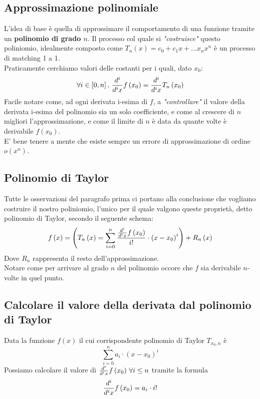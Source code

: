 \documentclass{report}
\begin{document}
    \subsection{Approssimazione polinomiale}
        L'idea di base è quella di approssimare il comportamento di una funzione 
        tramite un \textbf{polinomio di grado $n$}.
        Il processo col quale si \textit{"costruisce"} questo poliniomio, idealmente composto come $T_n\left(x\right) = c_0 + c_1x + ... x_nx^n$
        è un processo di matching 1 a 1. \\
        Praticamente cerchiamo valori delle costanti per i quali, dato $x_0$:
        $$\forall i \in \left[0, n\right], \, \D{x}{i}f\left(x_0\right) = \D{x}{i}T_n\left(x_0\right)$$
        Facile notare come, ad ogni derivata i-esima di $f$, a \textit{"controllare"} il valore 
        della derivata i-esima del polinomio sia un solo coefficiente, e
        come al crescere di $n$ migliori l'approssimazione, e come il limite 
        di $n$ è data da quante volte è derivabile $f\left(x_0\right)$. \\
        E' bene tenere a mente che esiste sempre un errore di approssimazione di ordine $o\left(x^n\right)$. \\
    \subsection{Polinomio di Taylor}
        Tutte le osservazioni del paragrafo prima ci portano alla conclusione che vogliamo 
        costruire il nostro poliniomio, l'unico per il quale valgono queste proprietà, detto polinomio di Taylor, secondo il seguente schema:
        $$f\left(x\right) = \left(T_n\left(x\right) = \sum_{i = 0}^{n}\frac{\D{x}{i}f\left(x_0\right)}{i!}\cdot\left(x-x_0\right)^i\right) + R_n\left(x\right)$$
        Dove $R_n$ rappresenta il resto dell'approssimazione. \\
        Notare come per arrivare al grado $n$ del polinomio occore che $f$ sia derivabile $n$-volte 
        in quel punto.
    \subsection{Calcolare il valore della derivata dal polinomio di Taylor}
            Data la funzione $f\left(x\right)$ il cui corrispondente polinomio di Taylor $T_{x_0,n}$ è 
            $$\sum_{i = 0}^n a_i \cdot \left(x - x_0\right)^i$$
            Possiamo calcolare il valore di $\D{x}{i}f\left(x_0\right) \, \forall i \leq n$ tramite la formula
            $$\D{x}{i}f\left(x_0\right) = a_i \cdot i!$$
\end{document}
